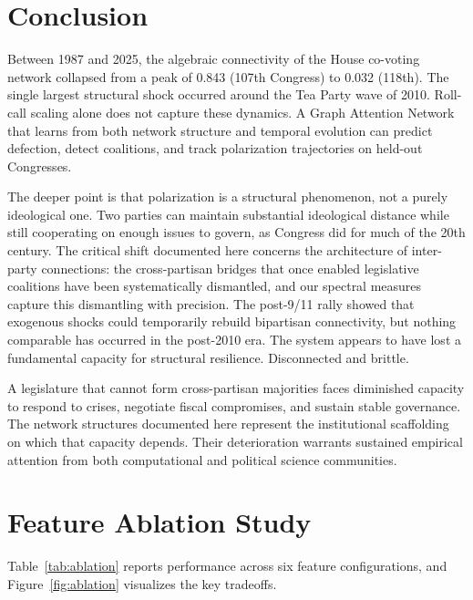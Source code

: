 \documentclass[12pt, a4paper]{article}
\begin{document}
\section{Conclusion}

Between 1987 and 2025, the algebraic connectivity of the House co-voting network collapsed from a peak of 0.843 (107th Congress) to 0.032 (118th). The single largest structural shock occurred around the Tea Party wave of 2010. Roll-call scaling alone does not capture these dynamics. A Graph Attention Network that learns from both network structure and temporal evolution can predict defection, detect coalitions, and track polarization trajectories on held-out Congresses.

The deeper point is that polarization is a structural phenomenon, not a purely ideological one. Two parties can maintain substantial ideological distance while still cooperating on enough issues to govern, as Congress did for much of the 20th century. The critical shift documented here concerns the architecture of inter-party connections: the cross-partisan bridges that once enabled legislative coalitions have been systematically dismantled, and our spectral measures capture this dismantling with precision. The post-9/11 rally showed that exogenous shocks could temporarily rebuild bipartisan connectivity, but nothing comparable has occurred in the post-2010 era. The system appears to have lost a fundamental capacity for structural resilience. Disconnected and brittle.

A legislature that cannot form cross-partisan majorities faces diminished capacity to respond to crises, negotiate fiscal compromises, and sustain stable governance. The network structures documented here represent the institutional scaffolding on which that capacity depends. Their deterioration warrants sustained empirical attention from both computational and political science communities.




\appendix

\section{Feature Ablation Study}
\label{app:ablation}

Table~\ref{tab:ablation} reports performance across six feature configurations, and Figure~\ref{fig:ablation} visualizes the key tradeoffs.
\end{document}
